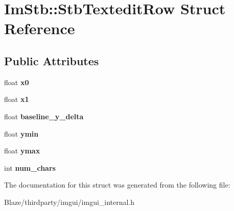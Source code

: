 \hypertarget{structImStb_1_1StbTexteditRow}{}\section{Im\+Stb\+:\+:Stb\+Textedit\+Row Struct Reference}
\label{structImStb_1_1StbTexteditRow}
\subsection*{Public Attributes}
\begin{DoxyCompactItemize}
\item 
\mbox{\label{structImStb_1_1StbTexteditRow_a2059076dfcc9bd26e63796e870265a6b}} 
float {\bfseries x0}
\item 
\mbox{\label{structImStb_1_1StbTexteditRow_a832458012a87652a9473d1933c9e06e9}} 
float {\bfseries x1}
\item 
\mbox{\label{structImStb_1_1StbTexteditRow_a135082081ed3982fdf5ca648b9111eb4}} 
float {\bfseries baseline\+\_\+y\+\_\+delta}
\item 
\mbox{\label{structImStb_1_1StbTexteditRow_a2b4c4926f3b556b5edb0010abd07a7c1}} 
float {\bfseries ymin}
\item 
\mbox{\label{structImStb_1_1StbTexteditRow_a339f55d2fc566ca049596ee3286bbc87}} 
float {\bfseries ymax}
\item 
\mbox{\label{structImStb_1_1StbTexteditRow_ac0ee658019010e456da1116a6ea7c2ba}} 
int {\bfseries num\+\_\+chars}
\end{DoxyCompactItemize}


The documentation for this struct was generated from the following file\+:\begin{DoxyCompactItemize}
\item 
Blaze/thirdparty/imgui/imgui\+\_\+internal.\+h\end{DoxyCompactItemize}
